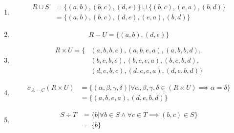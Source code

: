 \begin{enumerate}
	\item \begin{displaymath}
	\begin{split}
		R\cup S & = \{ (a, b), (b, c), (d, e)\} \cup \{ (b, c), (e, a), (b, d)\}\\
		& = \{ (a, b), (b, c), (d, e), (e, a), (b, d)\}
	\end{split}
	\end{displaymath}
	
	\item \begin{displaymath}
		R-U = \{(a, b), (d, e)\}
	\end{displaymath}
	
	\item \begin{displaymath}
	\begin{split}
		R\times U = \{ &(a, b, b, c), (a, b, e, a), (a, b, b, d),\\
		& (b, c, b, c), (b, c, e, a), (b, c, b, d),\\
		& (d, e, b, c), (d, e, e, a), (d, e, b, d)\}
	\end{split}
	\end{displaymath}
	
	\item \begin{displaymath}
	\begin{split}
		\sigma_{A=C} (R\times U) & = \{(\alpha , \beta , \gamma, \delta) | \forall \alpha , \beta , \gamma, \delta \in (R\times U) \implies \alpha = \delta \}\\
		& = \{ (a, b, e, a), (d, e, b, d)\}
	\end{split}
	\end{displaymath}
	
	\item
	\begin{equation*}
	\begin{split}
		S\div T & = \{ b  |  \forall b \in S \land \forall c \in T \implies (b , c) \in S\}\\
		& = \{b\}
	\end{split}
	\end{equation*}
	
\end{enumerate}